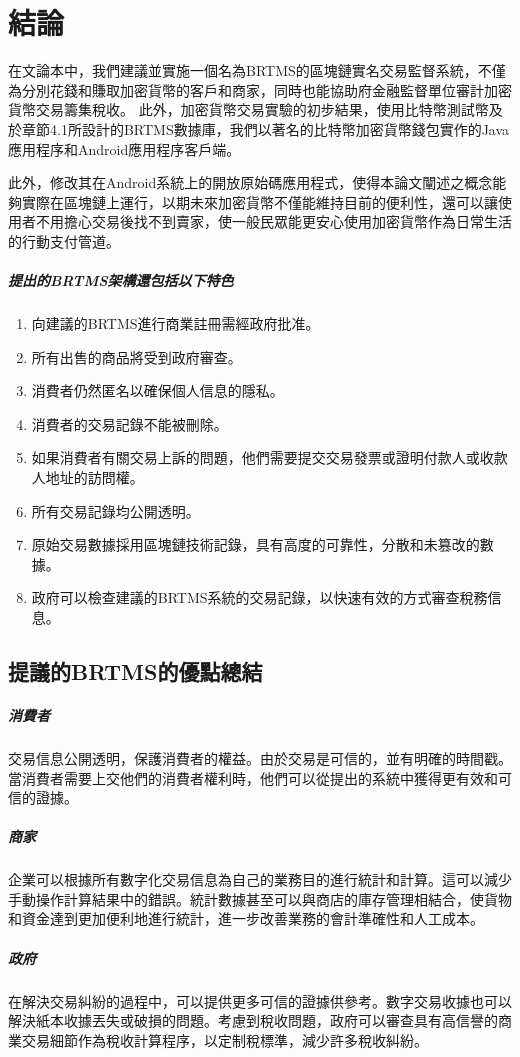 
\chapter{結論}
在文論本中，我們建議並實施一個名為BRTMS的區塊鏈實名交易監督系統，不僅為分別花錢和賺取加密貨幣的客戶和商家，同時也能協助府金融監督單位審計加密貨幣交易籌集稅收。 此外，加密貨幣交易實驗的初步結果，使用比特幣測試幣及於章節4.1所設計的BRTMS數據庫，我們以著名的比特幣加密貨幣錢包實作的Java應用程序和Android應用程序客戶端。
	
此外，修改其在Android系統上的開放原始碼應用程式，使得本論文闡述之概念能夠實際在區塊鏈上運行，以期未來加密貨幣不僅能維持目前的便利性，還可以讓使用者不用擔心交易後找不到賣家，使一般民眾能更安心使用加密貨幣作為日常生活的行動支付管道。

	\paragraph{提出的BRTMS架構還包括以下特色}

		\begin{enumerate}
			\item 向建議的BRTMS進行商業註冊需經政府批准。
			\item 所有出售的商品將受到政府審查。
			\item 消費者仍然匿名以確保個人信息的隱私。
			\item 消費者的交易記錄不能被刪除。
			\item 如果消費者有關交易上訴的問題，他們需要提交交易發票或證明付款人或收款人地址的訪問權。
			\item 所有交易記錄均公開透明。
			\item 原始交易數據採用區塊鏈技術記錄，具有高度的可靠性，分散和未篡改的數據。
			\item 政府可以檢查建議的BRTMS系統的交易記錄，以快速有效的方式審查稅務信息。
		\end{enumerate}

	\section{提議的BRTMS的優點總結}

		\paragraph{消費者}交易信息公開透明，保護消費者的權益。由於交易是可信的，並有明確的時間戳。當消費者需要上交他們的消費者權利時，他們可以從提出的系統中獲得更有效和可信的證據。
		\paragraph{商家}企業可以根據所有數字化交易信息為自己的業務目的進行統計和計算。這可以減少手動操作計算結果中的錯誤。統計數據甚至可以與商店的庫存管理相結合，使貨物和資金達到更加便利地進行統計，進一步改善業務的會計準確性和人工成本。
		\paragraph{政府}在解決交易糾紛的過程中，可以提供更多可信的證據供參考。數字交易收據也可以解決紙本收據丟失或破損的問題。考慮到稅收問題，政府可以審查具有高信譽的商業交易細節作為稅收計算程序，以定制稅標準，減少許多稅收糾紛。